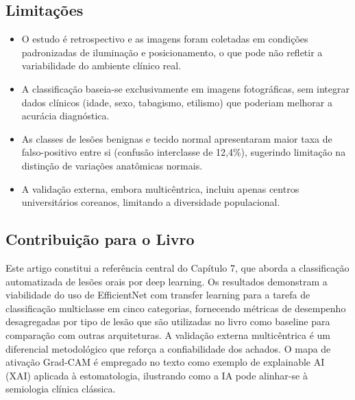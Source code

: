 \subsection{Limitações}
\begin{itemize}
  \item O estudo é retrospectivo e as imagens foram coletadas em condições
        padronizadas de iluminação e posicionamento, o que pode não refletir
        a variabilidade do ambiente clínico real.
  \item A classificação baseia-se exclusivamente em imagens fotográficas,
        sem integrar dados clínicos (idade, sexo, tabagismo, etilismo) que
        poderiam melhorar a acurácia diagnóstica.
  \item As classes de lesões benignas e tecido normal apresentaram maior
        taxa de falso-positivo entre si (confusão interclasse de 12,4\%),
        sugerindo limitação na distinção de variações anatômicas normais.
  \item A validação externa, embora multicêntrica, incluiu apenas centros
        universitários coreanos, limitando a diversidade populacional.
\end{itemize}

\subsection{Contribuição para o Livro}
Este artigo constitui a referência central do Capítulo 7, que aborda a
classificação automatizada de lesões orais por deep learning. Os resultados
demonstram a viabilidade do uso de EfficientNet com transfer learning para
a tarefa de classificação multiclasse em cinco categorias, fornecendo
métricas de desempenho desagregadas por tipo de lesão que são utilizadas
no livro como baseline para comparação com outras arquiteturas. A
validação externa multicêntrica é um diferencial metodológico que reforça
a confiabilidade dos achados. O mapa de ativação Grad-CAM é empregado no
texto como exemplo de explainable AI (XAI) aplicada à estomatologia,
ilustrando como a IA pode alinhar-se à semiologia clínica clássica.

